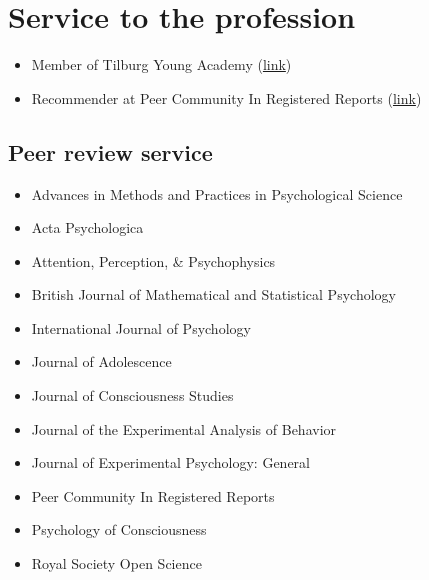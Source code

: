 \documentclass[12pt, a4paper]{article}
\begin{document}
\section*{Service to the profession}

\begin{itemize}
  \item Member of Tilburg Young Academy (\href{https://www.tilburguniversity.edu/research/tilburg-young-academy/members}{link})
  \item Recommender at Peer Community In Registered Reports (\href{https://rr.peercommunityin.org/public/user_public_page?userId=1570}{link})
\end{itemize}

\subsection*{Peer review service}
\begin{itemize}
  \item Advances in Methods and Practices in Psychological Science
  \item Acta Psychologica
  \item Attention, Perception, \& Psychophysics
  \item British Journal of Mathematical and Statistical Psychology
  \item International Journal of Psychology
  \item Journal of Adolescence
  \item Journal of Consciousness Studies
  \item Journal of the Experimental Analysis of Behavior
  \item Journal of Experimental Psychology: General
  \item Peer Community In Registered Reports
  \item Psychology of Consciousness
  \item Royal Society Open Science
\end{itemize}

\vfill{}
\end{document}

